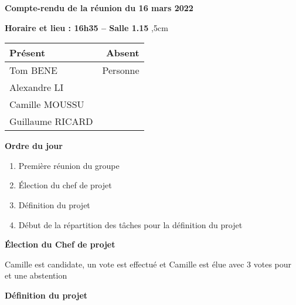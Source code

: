 \documentclass[12pt,a4paper,final]{report}
\begin{document}
\begin{center}
\Large \textbf{Compte-rendu de la réunion du 16 mars 2022}
\end{center}

\textbf{Horaire et lieu : 16h35 -- Salle 1.15}
,5cm

\begin{center}
\begin{tabular}{|l|r|}
    \hline
    Présent & Absent \\
    \hline
    Tom BENE & Personne \\
    Alexandre LI & \\
    Camille MOUSSU & \\
    Guillaume RICARD & \\
    \hline
\end{tabular}
\end{center}

\begin{flushleft}
    \textbf{Ordre du jour}
\end{flushleft}

\begin{enumerate}
    \item Première réunion du groupe
	\item Élection du chef de projet
    \item Définition du projet
	\item Début de la répartition des tâches pour la définition du projet

\end{enumerate}

\begin{flushleft}
    \textbf{Élection du Chef de projet}
\end{flushleft}
Camille est candidate, un vote est effectué et Camille est élue avec 3 votes pour et une abstention
\begin{flushleft}
    \textbf{Définition du projet}
\end{flushleft}
\end{document}
